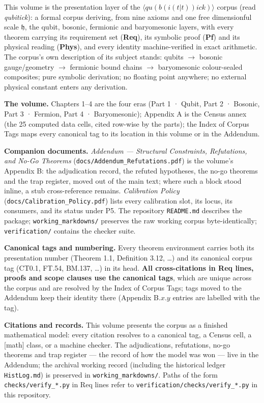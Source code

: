 \documentclass[11pt,openany]{book}
\theoremstyle{canonplain}
\theoremstyle{canondef}
\begin{document}
This volume is the presentation layer of the $\langle qu(b(i(t|t))ick)\rangle$
corpus (read \textit{qubitick}): a formal corpus
deriving, from nine axioms and one free dimensionful scale $\mathfrak h$, the
qubit, bosonic, fermionic and baryomesonic layers, with every theorem carrying
its requirement set (\textbf{Req}), its symbolic proof (\textbf{Pf}) and its
physical reading (\textbf{Phys}), and every identity machine-verified in exact
arithmetic. The corpus's own description of its subject stands: qubits
$\longrightarrow$ bosonic gauge/geometry $\longrightarrow$ fermionic bound
chains $\longrightarrow$ baryomesonic colour-sealed composites; pure symbolic
derivation; no floating point anywhere; no external physical constant enters
any derivation.

\medskip
\noindent\textbf{The volume.}\quad
Chapters 1--4 are the four eras (Part 1 · Qubit, Part 2 · Bosonic,
Part 3 · Fermion, Part 4 · Baryomesonic); Appendix A is the Census annex (the
25 computed data cells, cited row-wise by the parts); the Index of Corpus Tags
maps every canonical tag to its location in this volume or in the Addendum.

\noindent\textbf{Companion documents.}\quad
\textit{Addendum --- Structural Constraints, Refutations, and No-Go Theorems}
(\texttt{docs/Addendum\_Refutations.pdf}) is the volume's Appendix B: the
adjudication record, the refuted hypotheses, the no-go theorems and the trap
register, moved out of the main text; where such a block stood inline, a stub
cross-reference remains. \textit{Calibration Policy}
(\texttt{docs/Calibration\_Policy.pdf}) lists every calibration slot, its
locus, its consumers, and its status under P5. The repository
\texttt{README.md} describes the package; \texttt{working\_markdowns/}
preserves the raw working corpus byte-identically;
\texttt{verification/} contains the checker suite.

\noindent\textbf{Canonical tags and numbering.}\quad
Every theorem environment carries both its presentation number (Theorem 1.1,
Definition 3.12, \dots) and its canonical corpus tag (CT0.1, FT.54, BM.137,
\dots) in its head. \textbf{All cross-citations in Req lines, proofs and scope
clauses use the canonical tags}, which are unique across the corpus and are
resolved by the Index of Corpus Tags; tags moved to the Addendum keep their
identity there (Appendix B.$x$.$y$ entries are labelled with the tag).

\noindent\textbf{Citations and records.}\quad
This volume presents the corpus as a finished mathematical model: every
citation resolves to a canonical tag, a Census cell, a [math] class, or a
machine checker. The adjudications, refutations, no-go theorems and trap
register --- the record of how the model was won --- live in the Addendum;
the archival working record (including the historical ledger
\texttt{HistLog.md}) is preserved in \texttt{working\_markdowns/}. Paths of
the form \texttt{checks/verify\_*.py} in Req lines refer to
\texttt{verification/checks/verify\_*.py} in this repository.
\end{document}
